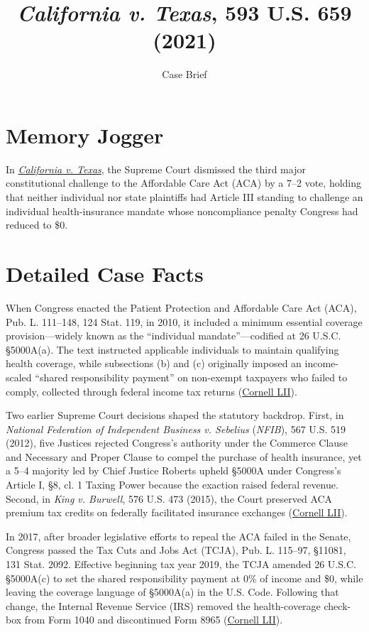 \documentclass[12pt]{article}
\title{\textit{California v. Texas}, 593 U.S. 659 (2021)}
\subtitle{Case Brief}
\author{}
\date{}
\begin{document}
\maketitle

\section{Memory Jogger}

In \href{https://www.courtlistener.com/opinion/4892571/california-v-texas/}{\textit{California v. Texas}}, the Supreme Court dismissed the third major constitutional challenge to the Affordable Care Act (ACA) by a 7--2 vote, holding that neither individual nor state plaintiffs had Article III standing to challenge an individual health-insurance mandate whose noncompliance penalty Congress had reduced to \$0.

\section{Detailed Case Facts}

When Congress enacted the Patient Protection and Affordable Care Act (ACA), Pub. L. 111--148, 124 Stat. 119, in 2010, it included a minimum essential coverage provision---widely known as the ``individual mandate''---codified at 26 U.S.C. \S 5000A(a). The text instructed applicable individuals to maintain qualifying health coverage, while subsections (b) and (c) originally imposed an income-scaled ``shared responsibility payment'' on non-exempt taxpayers who failed to comply, collected through federal income tax returns (\href{https://www.law.cornell.edu/supremecourt/text/19-840}{Cornell LII}).

Two earlier Supreme Court decisions shaped the statutory backdrop. First, in \textit{National Federation of Independent Business v. Sebelius} (\textit{NFIB}), 567 U.S. 519 (2012), five Justices rejected Congress's authority under the Commerce Clause and Necessary and Proper Clause to compel the purchase of health insurance, yet a 5--4 majority led by Chief Justice Roberts upheld \S 5000A under Congress's Article I, \S 8, cl. 1 Taxing Power because the exaction raised federal revenue. Second, in \textit{King v. Burwell}, 576 U.S. 473 (2015), the Court preserved ACA premium tax credits on federally facilitated insurance exchanges (\href{https://www.law.cornell.edu/supremecourt/text/19-840}{Cornell LII}).

In 2017, after broader legislative efforts to repeal the ACA failed in the Senate, Congress passed the Tax Cuts and Jobs Act (TCJA), Pub. L. 115--97, \S 11081, 131 Stat. 2092. Effective beginning tax year 2019, the TCJA amended 26 U.S.C. \S 5000A(c) to set the shared responsibility payment at 0\% of income and \$0, while leaving the coverage language of \S 5000A(a) in the U.S. Code. Following that change, the Internal Revenue Service (IRS) removed the health-coverage check-box from Form 1040 and discontinued Form 8965 (\href{https://www.law.cornell.edu/supremecourt/text/19-840}{Cornell LII}).
\end{document}
